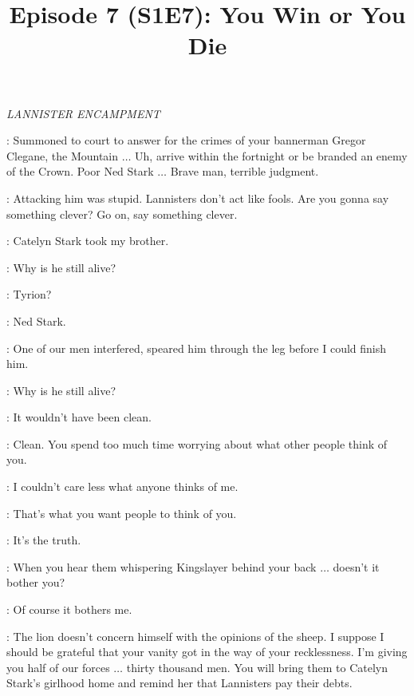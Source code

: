 

\title{Episode 7 (S1E7): You Win or You Die}
\author{}
\date{}
\maketitle




\scene

\textit{LANNISTER ENCAMPMENT}


\JAIME:  Summoned to court to answer for the crimes of your bannerman Gregor Clegane, the Mountain $\ldots$ Uh, arrive within the fortnight or be branded an enemy of the Crown. Poor Ned Stark $\ldots$ Brave man, terrible judgment. 

\TYWIN: Attacking him was stupid. Lannisters don't act like fools. Are you gonna say something clever? Go on, say something clever. 

\JAIME: Catelyn Stark took my brother. 

\TYWIN: Why is he still alive? 

\JAIME: Tyrion? 

\TYWIN: Ned Stark. 

\JAIME: One of our men interfered, speared him through the leg before I could finish him. 

\TYWIN: Why is he still alive? 

\JAIME: It wouldn't have been clean. 

\TYWIN: Clean. You spend too much time worrying about what other people think of you. 

\JAIME: I couldn't care less what anyone thinks of me. 

\TYWIN: That's what you want people to think of you. 

\JAIME: It's the truth. 

\TYWIN: When you hear them whispering Kingslayer behind your back $\ldots$ doesn't it bother you? 

\JAIME: Of course it bothers me. 

\TYWIN: The lion doesn't concern himself with the opinions of the sheep. I suppose I should be grateful that your vanity got in the way of your recklessness. I'm giving you half of our forces $\ldots$ thirty thousand men. You will bring them to Catelyn Stark's girlhood home and remind her that Lannisters pay their debts. 

